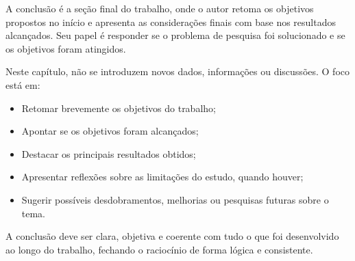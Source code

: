 
A conclusão é a seção final do trabalho, onde o autor retoma os objetivos propostos no início e apresenta as considerações finais com base nos resultados alcançados. Seu papel é responder se o problema de pesquisa foi solucionado e se os objetivos foram atingidos.

Neste capítulo, não se introduzem novos dados, informações ou discussões. O foco está em:

\begin{itemize}
    \item Retomar brevemente os objetivos do trabalho;
    \item Apontar se os objetivos foram alcançados;
    \item Destacar os principais resultados obtidos;
    \item Apresentar reflexões sobre as limitações do estudo, quando houver;
    \item Sugerir possíveis desdobramentos, melhorias ou pesquisas futuras sobre o tema.
\end{itemize}

A conclusão deve ser clara, objetiva e coerente com tudo o que foi desenvolvido ao longo do trabalho, fechando o raciocínio de forma lógica e consistente.

